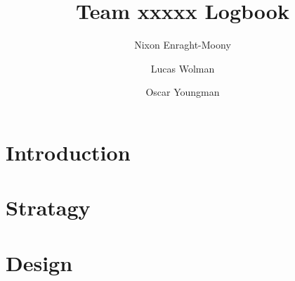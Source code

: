\documentclass[a4paper]{book}
\title{Team xxxxx Logbook}
\author{Nixon Enraght-Moony 
        \and
        Lucas Wolman
        \and
        Oscar Youngman
}
\begin{document}
\maketitle
\tableofcontents
\listoffigures
\listoftables
\part{Introduction}


\part{Stratagy}


\part{Design}

\end{document}
